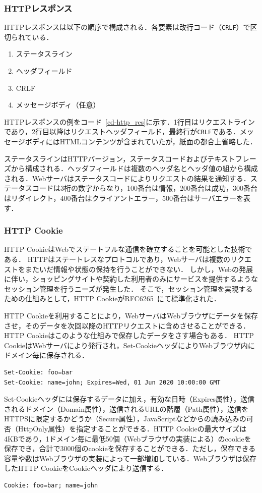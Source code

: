 \subsubsection{HTTPレスポンス}
HTTPレスポンスは以下の順序で構成される．各要素は改行コード（\texttt{CRLF}）で区切られている．
\begin{enumerate}
\item ステータスライン
\item ヘッダフィールド
\item CRLF
\item メッセージボディ（任意）
\end{enumerate}
HTTPレスポンスの例をコード~\ref{cd-http_res}に示す．1行目はリクエストラインであり，2行目以降はリクエストヘッダフィールド，最終行が\texttt{CRLF}である．メッセージボディにはHTMLコンテンツが含まれていたが，紙面の都合上省略した．

ステータスラインはHTTPバージョン，ステータスコードおよびテキストフレーズから構成される．ヘッダフィールドは複数のヘッダ名とヘッダ値の組から構成される．Webサーバはステータスコードによりリクエストの結果を通知する．ステータスコードは3桁の数字からなり，100番台は情報，200番台は成功，300番台はリダイレクト，400番台はクライアントエラー，500番台はサーバエラーを表す．
\subsubsection{HTTP Cookie}
HTTP CookieはWebでステートフルな通信を確立することを可能とした技術である．
HTTPはステートレスなプロトコルであり，Webサーバは複数のリクエストをまたいだ情報や状態の保持を行うことができない．
しかし，Webの発展に伴い，ショッピングサイトや契約した利用者のみにサービスを提供するようなセッション管理を行うニーズが発生した．
そこで，セッション管理を実現するための仕組みとして，HTTP CookieがRFC6265~\cite{rfc6265}にて標準化された．

HTTP Cookieを利用することにより，WebサーバはWebブラウザにデータを保存させ，そのデータを次回以降のHTTPリクエストに含めさせることができる．HTTP Cookieはこのような仕組みで保存したデータをさす場合もある．
HTTP CookieはWebサーバにより発行され，Set-CookieヘッダによりWebブラウザ内にドメイン毎に保存される．
\begin{verbatim}
Set-Cookie: foo=bar
Set-Cookie: name=john; Expires=Wed, 01 Jun 2020 10:00:00 GMT
\end{verbatim}
Set-Cookieヘッダには保存するデータに加え，有効な日時（Expires属性），送信されるドメイン（Domain属性），送信されるURLの階層（Path属性），送信をHTTPSに限定するかどうか（Secure属性），JavaScriptなどからの読み込みの可否（HttpOnly属性）を指定することができる．HTTP Cookieの最大サイズは4KBであり，1ドメイン毎に最低50個（Webブラウザの実装による）のcookieを保存でき，合計で3000個のcookieを保存することができる．ただし，保存できる容量や数はWebブラウザの実装によって一部増加している．Webブラウザは保存したHTTP CookieをCookieヘッダにより送信する．
\begin{verbatim}
Cookie: foo=bar; name=john
\end{verbatim}
